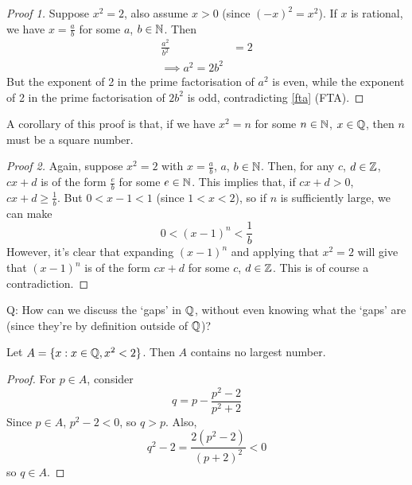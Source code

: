 \documentclass{../template/note}
\begin{document}
    \begin{proof}[Proof 1]
        Suppose \(x^2 = 2\), also assume \(x > 0\) (since \((-x)^2 = x^2\)). If \(x\) is rational, we have \(x = \frac{a}{b}\) for some \(a\), \(b \in \mathbb N\). Then
        \begin{align*}
            \frac{a^2}{b^2} &= 2 \\
            \implies a^2 = 2b^2
        \end{align*}
        But the exponent of 2 in the prime factorisation of \(a^2\) is even, while the exponent of 2 in the prime factorisation of \(2b^2\) is odd, contradicting \cref{fta} (FTA).        
    \end{proof}
    
    \begin{remark*}
        A corollary of this proof is that, if we have \(x^2 = n\) for some \(n \in \mathbb N\), \(x \in \mathbb Q\), then \(n\) must be a square number.
    \end{remark*}
    
    \begin{proof}[Proof 2]
        Again, suppose \(x^2 = 2\) with \(x = \frac{a}{b}\), \(a\), \(b \in \mathbb N\). Then, for any \(c\), \(d \in \mathbb Z\), \(cx + d\) is of the form \(\frac{e}{b}\) for some \(e \in \mathbb N\). This implies that, if \(cx + d > 0\), \(cx + d \geq \frac{1}{b}\). But \(0 < x-1 < 1\) (since \(1 < x < 2\)), so if \(n\) is sufficiently large, we can make
        \[  
            0 < (x-1)^n < \frac{1}{b}
        \]
        However, it's clear that expanding \((x-1)^n\) and applying that \(x^2 = 2\) will give that \((x-1)^n\) is of the form \(cx + d\) for some \(c\), \(d \in \mathbb Z\). This is of course a contradiction.
    \end{proof}
    
    Q: How can we discuss the `gaps' in \(\mathbb Q\), without even knowing what the `gaps' are (since they're by definition outside of \(\mathbb Q\))?
    
    \begin{proposition}
        Let \(A = \{x: x \in \mathbb Q, x^2 < 2\}\). Then \(A\) contains no largest number.
    \end{proposition}

    \begin{proof}
        For \(p \in A\), consider
        \[
            q = p - \frac{p^2-2}{p^2+2}
        \]
        Since \(p \in A\), \(p^2 - 2 < 0\), so \(q > p\). Also,
        \[
            q^2-2 = \frac{2(p^2-2)}{(p+2)^2} < 0
        \]
        so \(q \in A\).
    \end{proof}
    
\end{document}
